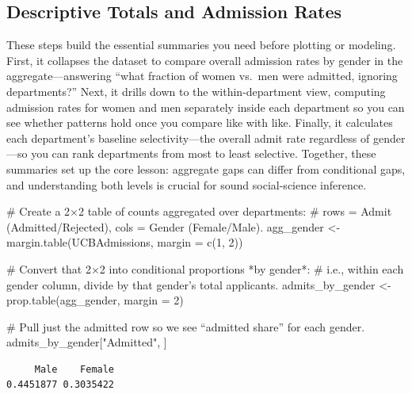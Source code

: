 \documentclass[
  letterpaper,
  DIV=11,
  numbers=noendperiod]{scrreprt}
\newenvironment{Shaded}{\begin{snugshade}}{\end{snugshade}}
\newcommand{\AttributeTok}[1]{\textcolor[rgb]{0.40,0.45,0.13}{#1}}
\newcommand{\CommentTok}[1]{\textcolor[rgb]{0.37,0.37,0.37}{#1}}
\newcommand{\DecValTok}[1]{\textcolor[rgb]{0.68,0.00,0.00}{#1}}
\newcommand{\FunctionTok}[1]{\textcolor[rgb]{0.28,0.35,0.67}{#1}}
\newcommand{\NormalTok}[1]{\textcolor[rgb]{0.00,0.23,0.31}{#1}}
\newcommand{\OtherTok}[1]{\textcolor[rgb]{0.00,0.23,0.31}{#1}}
\newcommand{\StringTok}[1]{\textcolor[rgb]{0.13,0.47,0.30}{#1}}
\begin{document}
\subsection{Descriptive Totals and Admission
Rates}\label{descriptive-totals-and-admission-rates}

These steps build the essential summaries you need before plotting or
modeling. First, it collapses the dataset to compare overall admission
rates by gender in the aggregate---answering ``what fraction of women
vs.~men were admitted, ignoring departments?'' Next, it drills down to
the within-department view, computing admission rates for women and men
separately inside each department so you can see whether patterns hold
once you compare like with like. Finally, it calculates each
department's baseline selectivity---the overall admit rate regardless of
gender---so you can rank departments from most to least selective.
Together, these summaries set up the core lesson: aggregate gaps can
differ from conditional gaps, and understanding both levels is crucial
for sound social-science inference.

\begin{Shaded}
\begin{Highlighting}[]
\CommentTok{\# Create a 2×2 table of counts aggregated over departments:}
\CommentTok{\# rows = Admit (Admitted/Rejected), cols = Gender (Female/Male).}
\NormalTok{agg\_gender }\OtherTok{\textless{}{-}} \FunctionTok{margin.table}\NormalTok{(UCBAdmissions, }\AttributeTok{margin =} \FunctionTok{c}\NormalTok{(}\DecValTok{1}\NormalTok{, }\DecValTok{2}\NormalTok{))}

\CommentTok{\# Convert that 2×2 into conditional proportions *by gender*:}
\CommentTok{\# i.e., within each gender column, divide by that gender’s total applicants.}
\NormalTok{admits\_by\_gender }\OtherTok{\textless{}{-}} \FunctionTok{prop.table}\NormalTok{(agg\_gender, }\AttributeTok{margin =} \DecValTok{2}\NormalTok{)}

\CommentTok{\# Pull just the admitted row so we see “admitted share” for each gender.}
\NormalTok{admits\_by\_gender[}\StringTok{"Admitted"}\NormalTok{, ]}
\end{Highlighting}
\end{Shaded}

\begin{verbatim}
     Male    Female 
0.4451877 0.3035422 
\end{verbatim}
\end{document}
